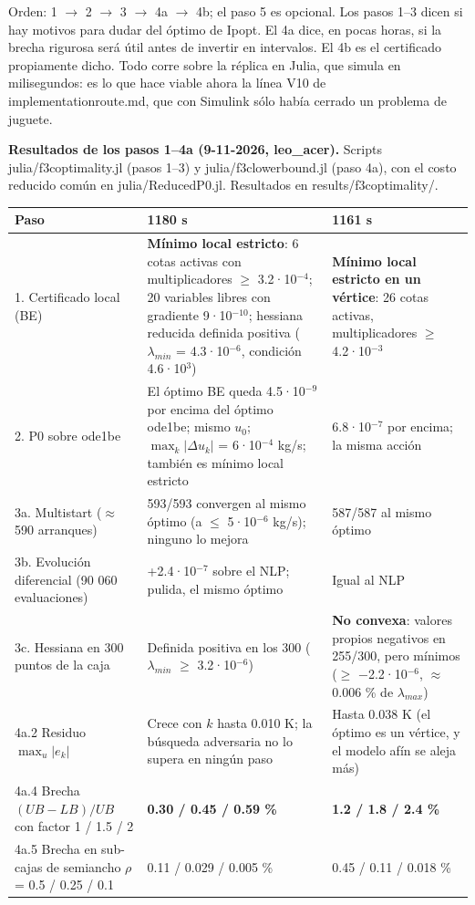 \documentclass[11pt,a4paper]{article}
\newcommand{\codeus}{\textunderscore\allowbreak}
\newcommand{\code}[1]{{\small\ttfamily\let\_\codeus #1}}
\begin{document}
Orden: 1 $\to$ 2 $\to$ 3 $\to$ 4a $\to$ 4b; el paso 5 es opcional. Los pasos 1–3 dicen si hay motivos para dudar del óptimo de Ipopt. El 4a dice, en pocas horas, si la brecha rigurosa será útil antes de invertir en intervalos. El 4b es el certificado propiamente dicho. Todo corre sobre la réplica en Julia, que simula en milisegundos: es lo que hace viable ahora la línea V10 de \code{implementation\_route.md}, que con Simulink sólo había cerrado un problema de juguete.

\textbf{Resultados de los pasos 1–4a (9-11-2026, leo\_acer).} Scripts \code{julia/f3c\_optimality.jl} (pasos 1–3) y \code{julia/f3c\_lower\_bound.jl} (paso 4a), con el costo reducido común en \code{julia/ReducedP0.jl}. Resultados en \code{results/f3c\_optimality/}.

{\small
\begin{xltabular}{\linewidth}{@{}YYY@{}}
\toprule
\textbf{Paso} & \textbf{1180 s} & \textbf{1161 s} \\
\midrule
{}. Certificado local (BE) & \textbf{Mínimo local estricto}: 6 cotas activas con multiplicadores $\ge$ 3.2·10$^{-4}$; 20 variables libres con gradiente 9·10$^{-10}$; hessiana reducida definida positiva ($\lambda _{min}$ = 4.3·10$^{-6}$, condición 4.6·10$^{3}$) & \textbf{Mínimo local estricto en un vértice}: 26 cotas activas, multiplicadores $\ge$ 4.2·10$^{-3}$ \\
2. P0 sobre \code{ode1be} & El óptimo BE queda 4.5·10$^{-9}$ por encima del óptimo \code{ode1be}; mismo $u_0$; $\max_k\lvert\Delta u_k\rvert$ = 6·10$^{-4}$ kg/s; también es mínimo local estricto & 6.8·10$^{-7}$ por encima; la misma acción \\
3a. Multistart ($\approx$ 590 arranques) & 593/593 convergen al mismo óptimo (a $\le$ 5·10$^{-6}$ kg/s); ninguno lo mejora & 587/587 al mismo óptimo \\
3b. Evolución diferencial (90 060 evaluaciones) & +2.4·10$^{-7}$ sobre el NLP; pulida, el mismo óptimo & Igual al NLP \\
3c. Hessiana en 300 puntos de la caja & Definida positiva en los 300 ($\lambda _{min}$ $\ge$ 3.2·10$^{-6}$) & \textbf{No convexa}: valores propios negativos en 255/300, pero mínimos ($\ge$ $-$2.2·10$^{-6}$, $\approx$ 0.006 \% de $\lambda _{max}$) \\
4a.2 Residuo $\max_u\lvert e_k\rvert$ & Crece con $k$ hasta 0.010 K; la búsqueda adversaria no lo supera en ningún paso & Hasta 0.038 K (el óptimo es un vértice, y el modelo afín se aleja más) \\
4a.4 Brecha $(UB-LB)/UB$ con factor 1 / 1.5 / 2 & \textbf{0.30 / 0.45 / 0.59 \%} & \textbf{1.2 / 1.8 / 2.4 \%} \\
4a.5 Brecha en sub-cajas de semiancho $\rho$ = 0.5 / 0.25 / 0.1 & 0.11 / 0.029 / 0.005 \% & 0.45 / 0.11 / 0.018 \% \\
\bottomrule
\end{xltabular}}
\end{document}
